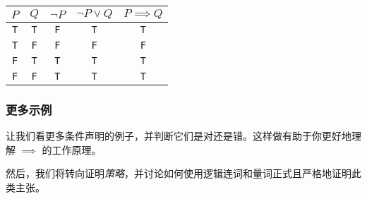 \begin{center}
    \begin{tabular}{c|c|c|c|c}
          $P$      & $Q$      & $\neg P$ & $\neg P \lor Q$ & $P \implies Q$ \\
          \hline
          \verb|T| & \verb|T| & \verb|F| &     \verb|T|    &  \verb|T|   \\
          \verb|T| & \verb|F| & \verb|F| &     \verb|F|    &  \verb|F|   \\
          \verb|F| & \verb|T| & \verb|T| &     \verb|T|    &  \verb|T|   \\
          \verb|F| & \verb|F| & \verb|T| &     \verb|T|    &  \verb|T|   \\
    \end{tabular}
\end{center}

\subsubsection*{更多示例}

让我们看更多条件声明的例子，并判断它们是对还是错。这样做有助于你更好地理解 $\implies$ 的工作原理。

然后，我们将转向证明\emph{策略}，并讨论如何使用逻辑连词和量词正式且严格地证明此类主张。

